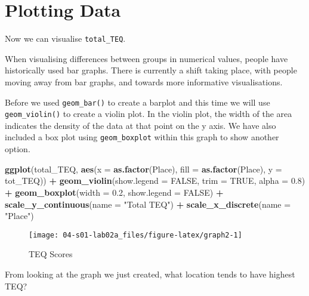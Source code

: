 \documentclass[]{book}
\newenvironment{Shaded}{\begin{snugshade}}{\end{snugshade}}
\newcommand{\KeywordTok}[1]{\textcolor[rgb]{0.13,0.29,0.53}{\textbf{#1}}}
\newcommand{\DataTypeTok}[1]{\textcolor[rgb]{0.13,0.29,0.53}{#1}}
\newcommand{\FloatTok}[1]{\textcolor[rgb]{0.00,0.00,0.81}{#1}}
\newcommand{\StringTok}[1]{\textcolor[rgb]{0.31,0.60,0.02}{#1}}
\newcommand{\OtherTok}[1]{\textcolor[rgb]{0.56,0.35,0.01}{#1}}
\newcommand{\OperatorTok}[1]{\textcolor[rgb]{0.81,0.36,0.00}{\textbf{#1}}}
\newcommand{\NormalTok}[1]{#1}
\begin{document}
\section{Plotting Data}\label{plotting-data}

Now we can visualise \texttt{total\_TEQ}.

When visualising differences between groups in numerical values, people
have historically used bar graphs. There is currently a shift taking
place, with people moving away from bar graphs, and towards more
informative visualisations.

Before we used \texttt{geom\_bar()} to create a barplot and this time we
will use \texttt{geom\_violin()} to create a violin plot. In the violin
plot, the width of the area indicates the density of the data at that
point on the y axis. We have also included a box plot using
\texttt{geom\_boxplot} within this graph to show another option.

\begin{Shaded}
\begin{Highlighting}[]
\KeywordTok{ggplot}\NormalTok{(total_TEQ, }\KeywordTok{aes}\NormalTok{(}\DataTypeTok{x =} \KeywordTok{as.factor}\NormalTok{(Place), }\DataTypeTok{fill =} \KeywordTok{as.factor}\NormalTok{(Place), }\DataTypeTok{y =}\NormalTok{ tot_TEQ)) }\OperatorTok{+}\StringTok{ }\KeywordTok{geom_violin}\NormalTok{(}\DataTypeTok{show.legend =} \OtherTok{FALSE}\NormalTok{, }\DataTypeTok{trim =} \OtherTok{TRUE}\NormalTok{, }\DataTypeTok{alpha =} \FloatTok{0.8}\NormalTok{) }\OperatorTok{+}
\StringTok{  }\KeywordTok{geom_boxplot}\NormalTok{(}\DataTypeTok{width =} \FloatTok{0.2}\NormalTok{, }\DataTypeTok{show.legend =} \OtherTok{FALSE}\NormalTok{) }\OperatorTok{+}
\StringTok{  }\KeywordTok{scale_y_continuous}\NormalTok{(}\DataTypeTok{name =} \StringTok{"Total TEQ"}\NormalTok{) }\OperatorTok{+}
\StringTok{  }\KeywordTok{scale_x_discrete}\NormalTok{(}\DataTypeTok{name =} \StringTok{"Place"}\NormalTok{)}
\end{Highlighting}
\end{Shaded}

\begin{figure}

{\centering \texttt{[image: 04-s01-lab02a\_files/figure-latex/graph2-1]} 

}

\caption{TEQ Scores}\label{fig:graph2}
\end{figure}

From looking at the graph we just created, what location tends to have
highest TEQ?
\end{document}
